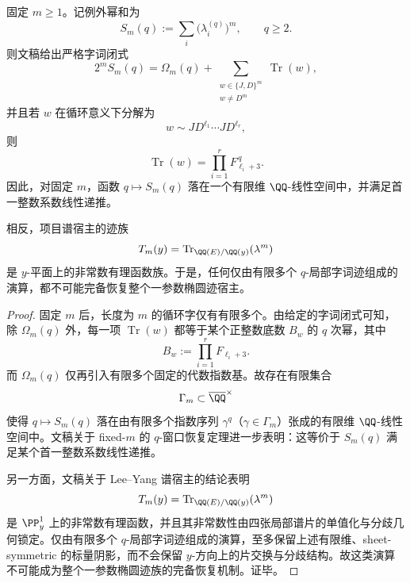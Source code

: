 \begin{theorem}\label{thm:conclusion-q-local-wordtrace-not-complete-for-elliptic-trace-family}
固定 \(m\ge 1\)。记例外幂和为
\[
S_m(q):=\sum_i\bigl(\lambda_i^{(q)}\bigr)^m,
\qquad q\ge 2.
\]
则文稿给出严格字词闭式
\[
2^mS_m(q)=\Omega_m(q)+\sum_{\substack{w\in\{J,D\}^m\\ w\neq D^m}}\operatorname{Tr}(w),
\]
并且若 \(w\) 在循环意义下分解为
\[
w\sim JD^{\ell_1}\cdots JD^{\ell_r},
\]
则
\[
\operatorname{Tr}(w)=\prod_{i=1}^{r}F_{\ell_i+3}^{\,q}.
\]
因此，对固定 \(m\)，函数 \(q\mapsto S_m(q)\) 落在一个有限维 \(\QQ\)-线性空间中，并满足首一整数系数线性递推。

相反，项目谱宿主的迹族
\[
T_m(y)=\operatorname{Tr}_{\QQ(E)/\QQ(y)}(\lambda^m)
\]
是 \(y\)-平面上的非常数有理函数族。于是，任何仅由有限多个 \(q\)-局部字词迹组成的演算，都不可能完备恢复整个一参数椭圆迹宿主。
\end{theorem}
\begin{proof}
固定 \(m\) 后，长度为 \(m\) 的循环字仅有有限多个。由给定的字词闭式可知，除 \(\Omega_m(q)\) 外，每一项 \(\operatorname{Tr}(w)\) 都等于某个正整数底数 \(B_w\) 的 \(q\) 次幂，其中
\[
B_w:=\prod_{i=1}^{r}F_{\ell_i+3}.
\]
而 \(\Omega_m(q)\) 仅再引入有限多个固定的代数指数基。故存在有限集合
\[
\Gamma_m\subset \overline{\QQ}^{\times}
\]
使得 \(q\mapsto S_m(q)\) 落在由有限多个指数序列 \(\gamma^q\)（\(\gamma\in\Gamma_m\)）张成的有限维 \(\QQ\)-线性空间中。文稿关于 fixed-\(m\) 的 \(q\)-窗口恢复定理进一步表明：这等价于 \(S_m(q)\) 满足某个首一整数系数线性递推。

另一方面，文稿关于 Lee--Yang 谱宿主的结论表明
\[
T_m(y)=\operatorname{Tr}_{\QQ(E)/\QQ(y)}(\lambda^m)
\]
是 \(\PP^1_y\) 上的非常数有理函数，并且其非常数性由四张局部谱片的单值化与分歧几何锁定。仅由有限多个 \(q\)-局部字词迹组成的演算，至多保留上述有限维、sheet-symmetric 的标量阴影，而不会保留 \(y\)-方向上的片交换与分歧结构。故这类演算不可能成为整个一参数椭圆迹族的完备恢复机制。证毕。
\end{proof}
